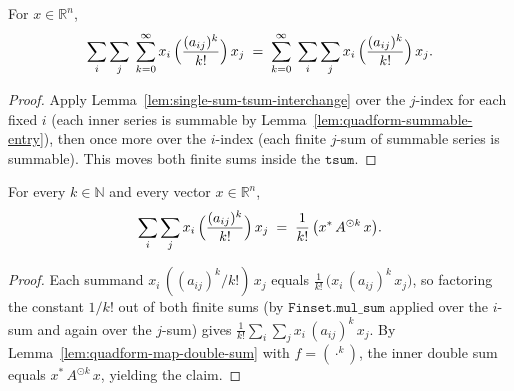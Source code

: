 \begin{lemma}
    \label{lem:quadform-double-sum-tsum-interchange}
    \leanok
    For $x \in \mathbb{R}^n$,
    \[
        \sum_{i}\sum_{j} \;\sum_{k=0}^{\infty} x_i\,\Bigl(\frac{(a_{ij})^k}{k!}\Bigr)\, x_j
        \;=\; \sum_{k=0}^{\infty} \;\sum_{i}\sum_{j} x_i\,\Bigl(\frac{(a_{ij})^k}{k!}\Bigr)\, x_j .
    \]
\end{lemma}
\begin{proof}
    Apply Lemma~\ref{lem:single-sum-tsum-interchange} over the $j$-index for each
    fixed $i$ (each inner series is summable by
    Lemma~\ref{lem:quadform-summable-entry}), then once more over the $i$-index
    (each finite $j$-sum of summable series is summable). This moves both finite
    sums inside the $\texttt{tsum}$.
\end{proof}

\begin{lemma}
    \label{lem:power-term-quadform}
    \leanok
    For every $k \in \mathbb{N}$ and every vector $x \in \mathbb{R}^n$,
    \[
        \sum_{i}\sum_{j} x_i\,\Bigl(\frac{(a_{ij})^k}{k!}\Bigr)\, x_j
        \;=\; \frac{1}{k!}\,\bigl(x^{*}\, A^{\odot k}\, x\bigr).
    \]
\end{lemma}
\begin{proof}
    Each summand $x_i\,((a_{ij})^k/k!)\,x_j$ equals
    $\tfrac{1}{k!}\,\bigl(x_i\,(a_{ij})^k\,x_j\bigr)$, so factoring the constant
    $1/k!$ out of both finite sums (by $\texttt{Finset.mul\_sum}$ applied over
    the $i$-sum and again over the $j$-sum) gives
    $\tfrac{1}{k!}\sum_i\sum_j x_i\,(a_{ij})^k\,x_j$. By
    Lemma~\ref{lem:quadform-map-double-sum} with $f = (\cdot^k)$, the inner double
    sum equals $x^{*}\,A^{\odot k}\,x$, yielding the claim.
\end{proof}

